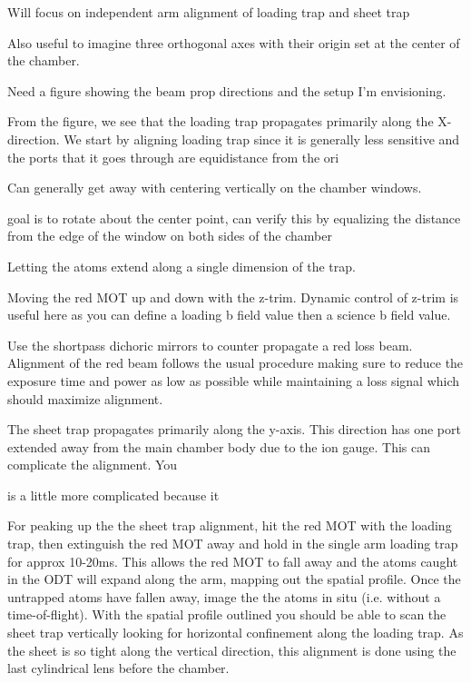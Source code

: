 Will focus on independent arm alignment of loading trap and sheet trap

Also useful to imagine three orthogonal axes with their origin set at the center of the chamber.

Need a figure showing the beam prop directions and the setup I'm envisioning.


From the figure, we see that the loading trap propagates primarily along the X-direction. We start by aligning loading trap since it is generally less sensitive and the ports that it goes through are equidistance from the ori

Can generally get away with centering vertically on the chamber windows. 

goal is to rotate about the center point, can verify this by equalizing the distance from the edge of the window on both sides of the chamber

Letting the atoms extend along a single dimension of the trap. 

Moving the red MOT up and down with the z-trim. Dynamic control of z-trim is useful here as you can define a loading b field value then a science b field value.

Use the shortpass dichoric mirrors to counter propagate a red loss beam. Alignment of the red beam follows the usual procedure making sure to reduce the exposure time and power as low as possible while maintaining a loss signal which should maximize alignment.








The sheet trap propagates primarily along the y-axis. This direction has one port extended away from the main chamber body due to the ion gauge. This can complicate the alignment. You

is a little more complicated because it 



For peaking up the the sheet trap alignment, hit the red MOT with the loading trap, then extinguish the red MOT away and hold in the single arm loading trap for approx 10-20ms. This allows the red MOT to fall away and the atoms caught in the ODT will expand along the arm, mapping out the spatial profile. Once the untrapped atoms have fallen away, image the the atoms in situ (i.e. without a time-of-flight). With the spatial profile outlined you should be able to scan the sheet trap vertically looking for horizontal confinement along the loading trap. As the sheet is so tight along the vertical direction, this alignment is done using the last cylindrical lens before the chamber. 

